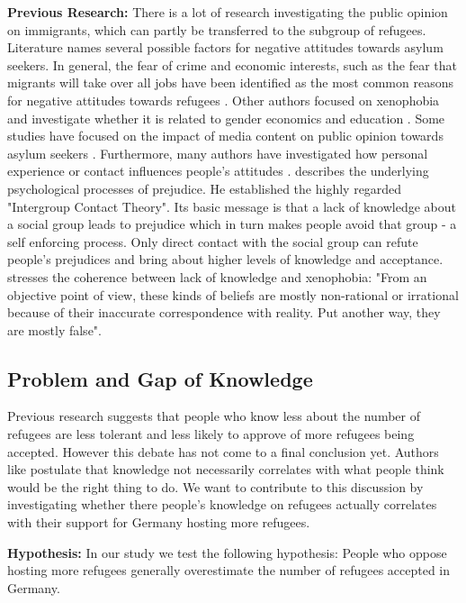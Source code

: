\textbf{Previous Research:}
There is a lot of research investigating the public opinion on immigrants, which can partly be transferred to the subgroup of refugees. Literature names several possible factors for negative attitudes towards asylum seekers. In general, the fear of crime and economic interests, such as the fear that migrants will take over all jobs have been identified as the most common reasons for negative attitudes towards refugees \citep{Otto2014}. Other authors focused on xenophobia and investigate whether it is related to gender \citep{Jolly2014} economics and education \citep{Francois2013}. Some studies have focused on the impact of media content on public opinion towards asylum seekers \citep{Boomgaarden2009, Perry1990, Brosius1995}. Furthermore, many authors have investigated how personal experience or contact influences people's attitudes \citep{Pettigrew1997}. \cite{Pettigrew1998} describes the underlying psychological processes of prejudice. He established the highly regarded "Intergroup Contact Theory". Its basic message is that a lack of knowledge about a social group leads to prejudice which in turn makes people avoid that group - a self enforcing process. Only direct contact with the social group can refute people's prejudices and bring about higher levels of knowledge and acceptance. \cite{Rydgren2004} stresses the coherence between lack of knowledge and xenophobia: "From an objective point of view, these kinds of beliefs are mostly non-rational or irrational because of their inaccurate correspondence with reality. Put another way, they are mostly false".

\subsection{Problem and Gap of Knowledge}
Previous research suggests that people who know less about the number of refugees are less tolerant and less likely to approve of more refugees being accepted. However this debate has not come to a final conclusion yet. Authors like \cite{Kahan2014} postulate that knowledge not necessarily correlates with what people think would be the right thing to do. We want to contribute to this discussion by investigating whether there people’s knowledge on refugees actually correlates with their support for Germany hosting more refugees.



\textbf{Hypothesis:}
In our study we test the following hypothesis: People who oppose hosting more refugees generally overestimate the number of refugees accepted in Germany.


